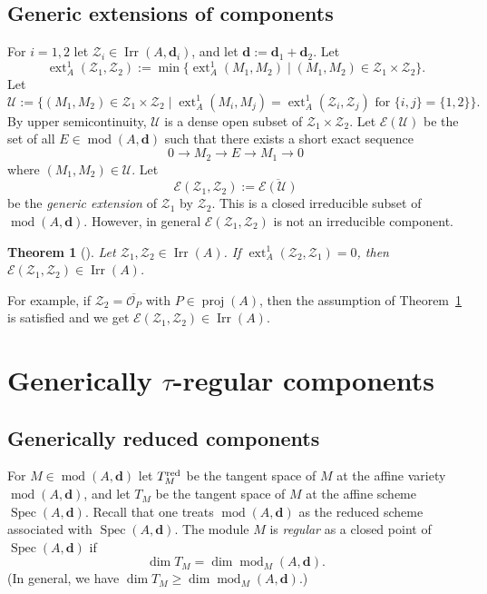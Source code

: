 \documentclass[12pt,reqno]{amsart}
\newtheorem{Thm}{Theorem}[section]
\theoremstyle{definition}
\newcommand{\cE}{{\mathcal E}}
\newcommand{\cO}{{\mathcal O}}
\newcommand{\bd}{\mathbf{d}}
\newcommand{\md}{\operatorname{mod}}
\newcommand{\Spec}{\operatorname{Spec}}
\newcommand{\proj}{\operatorname{proj}}
\newcommand{\ext}{\operatorname{ext}}
\newcommand{\irr}{\operatorname{Irr}}
\newcommand{\calU}{\mathcal{U}}
\newcommand{\calZ}{\mathcal{Z}}
\begin{document}
\subsection{Generic extensions of components}
\label{subsec:genericextension}
For $i=1,2$ let $\calZ_i \in \irr(A,\bd_i)$, and let
$\bd := \bd_1 + \bd_2$.
Let
$$
\ext_A^1(\calZ_1,\calZ_2) := \min\{ \ext_A^1(M_1,M_2) \mid
(M_1,M_2) \in \calZ_1 \times \calZ_2 \}.
$$
Let
$$
\calU := \{ (M_1,M_2) \in \calZ_1 \times \calZ_2 \mid \ext_A^1(M_i,M_j) = \ext_A^1(\calZ_i,\calZ_j)
\text{ for } \{ i,j \} = \{ 1,2 \} \}.
$$
By upper semicontinuity, $\calU$ is a dense open subset of
$\calZ_1 \times \calZ_2$.
Let
$\cE(\calU)$ be the set of all $E \in \md(A,\bd)$ such that there exists
a short exact sequence
$$
0 \to M_2 \to E \to M_1 \to 0
$$
where $(M_1,M_2) \in \calU$.
Let $$
\cE(\calZ_1,\calZ_2) := \overline{\cE(\calU)}
$$ be the
\emph{generic extension} of $\calZ_1$ by $\calZ_2$.
This is a closed irreducible subset of $\md(A,\bd)$.
However, in general $\cE(\calZ_1,\calZ_2)$ is not an irreducible
component.


\begin{Thm}[{\cite[Corollary~1.4]{CBS02}}]\label{thm:CBS}
Let $\calZ_1,\calZ_2 \in \irr(A)$.
If $\ext_A^1(\calZ_2,\calZ_1) = 0$, then
$\cE(\calZ_1,\calZ_2) \in \irr(A)$.
\end{Thm}

For example, if $\calZ_2 = \overline{\cO_P}$ with $P \in \proj(A)$,
then
the assumption of Theorem~\ref{thm:CBS} is satisfied and we get
$\cE(\calZ_1,\calZ_2) \in \irr(A)$.





\section{Generically $\tau$-regular
components}\label{sec:tauregintro}



\subsection{Generically reduced components}
For $M \in \md(A,\bd)$ let $T_M^{\rm red}$ be the tangent space of $M$ at the affine variety $\md(A,\bd)$, and let
$T_M$ be the tangent space of $M$ at the affine scheme
$\Spec(A,\bd)$.
Recall that one treats $\md(A,\bd)$ as the reduced scheme associated with $\Spec(A,\bd)$.
The module $M$ is \emph{regular} as a closed point of
$\Spec(A,\bd)$ if
$$
\dim T_M = \dim \md_M(A,\bd).
$$
(In general, we have $\dim T_M \ge \dim \md_M(A,\bd)$.)
\end{document}
